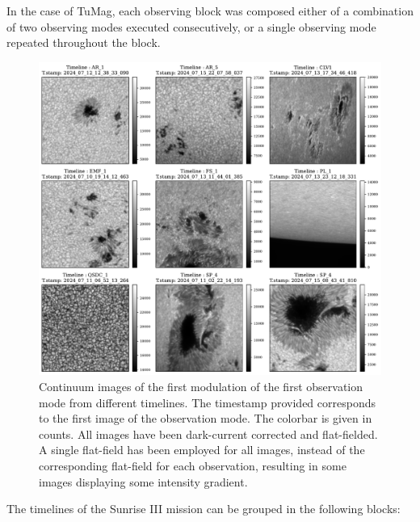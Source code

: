 In the case of TuMag, each observing block was composed either of a combination of two observing modes executed consecutively, or a single observing mode repeated throughout the block.  

\begin{figure}
  \includegraphics[width=\textwidth]{figures/Pipeline/timelines_Examples.pdf}
  \caption[Timelines mosaic.]{
    Continuum images of the first modulation of the first observation mode from different timelines. The timestamp provided corresponds to the first image of the observation mode. The colorbar is given in counts. All images have been dark-current corrected and flat-fielded. A single flat-field has been employed for all images, instead of the corresponding flat-field for each observation, resulting in some images displaying some intensity gradient.} 
    \label{fig_pipeline: timeline_examples}
\end{figure}

The timelines of the Sunrise III mission can be grouped in the following blocks: 

